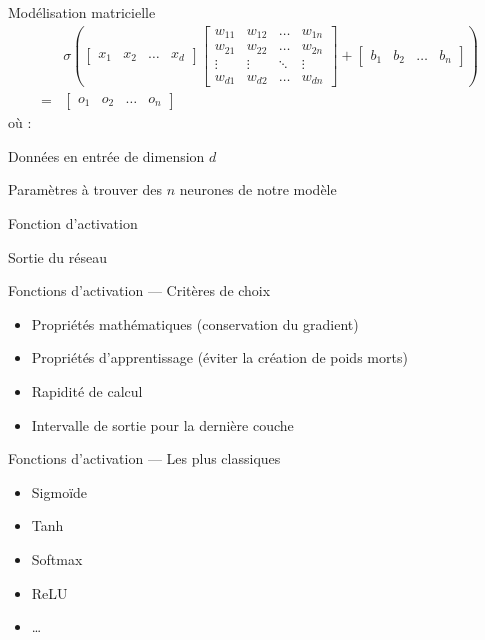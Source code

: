 \begin{frame}{Modélisation matricielle}
  \begin{align*}
    &
    \sigma \left(
    \begin{bmatrix}
      x_1 & x_2 & \dots & x_d
    \end{bmatrix}
    \begin{bmatrix}
      w_{11} & w_{12} & \dots  & w_{1n} \\
      w_{21} & w_{22} & \dots  & w_{2n} \\
      \vdots & \vdots & \ddots & \vdots \\
      w_{d1} & w_{d2} & \dots  & w_{dn}
    \end{bmatrix}
    +
    \begin{bmatrix}
      b_1 & b_2 & \dots & b_n
    \end{bmatrix}
    \right) \\
    = &
    \begin{bmatrix}
      o_1 & o_2 & \dots & o_n
    \end{bmatrix}
  \end{align*}
  où :
  \begin{description}[<+->]
    \item[X] Données en entrée de dimension $d$
    \item[W \& b] Paramètres à trouver des $n$ neurones de notre modèle
    \item[$\bm{\sigma}$] Fonction d'activation
    \item[O] Sortie du réseau
  \end{description}
\end{frame}

\begin{frame}{Fonctions d'activation --- Critères de choix}
  \begin{itemize}[<+->]
    \item Propriétés mathématiques (conservation du gradient)
    \item Propriétés d'apprentissage (éviter la création de poids morts)
    \item Rapidité de calcul
    \item Intervalle de sortie pour la dernière couche
  \end{itemize}
\end{frame}

\begin{frame}{Fonctions d'activation --- Les plus classiques}
  \begin{itemize}
  \item Sigmoïde
  \item Tanh
  \item Softmax
  \item ReLU
  \item …
  \end{itemize}
\end{frame}

